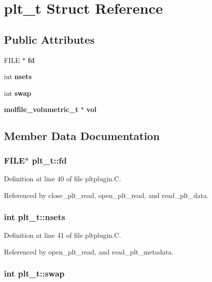 \section{plt\_\-t  Struct Reference}
\label{structplt__t}
\subsection*{Public Attributes}
\begin{CompactItemize}
\item 
FILE $\ast$ {\bf fd}
\item 
int {\bf nsets}
\item 
int {\bf swap}
\item 
{\bf molfile\_\-volumetric\_\-t} $\ast$ {\bf vol}
\end{CompactItemize}


\subsection{Member Data Documentation}
\subsubsection{\setlength{\rightskip}{0pt plus 5cm}FILE$\ast$ plt\_\-t::fd}\label{structplt__t_m0}




Definition at line 40 of file pltplugin.C.

Referenced by close\_\-plt\_\-read, open\_\-plt\_\-read, and read\_\-plt\_\-data.
\subsubsection{\setlength{\rightskip}{0pt plus 5cm}int plt\_\-t::nsets}\label{structplt__t_m1}




Definition at line 41 of file pltplugin.C.

Referenced by open\_\-plt\_\-read, and read\_\-plt\_\-metadata.
\subsubsection{\setlength{\rightskip}{0pt plus 5cm}int plt\_\-t::swap}\label{structplt__t_m2}




